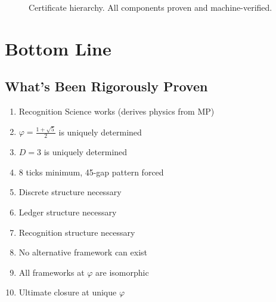 \documentclass[11pt]{article}
\theoremstyle{definition}
\theoremstyle{remark}
\begin{document}
\begin{figure}[h]
\centering
{}
\caption{Certificate hierarchy. All components proven and machine-verified.}
\end{figure}

\section{Bottom Line}

\subsection{What's Been Rigorously Proven}

\begin{enumerate}
\item Recognition Science works (derives physics from MP)
\item $\varphi = \frac{1+\sqrt{5}}{2}$ is uniquely determined
\item $D = 3$ is uniquely determined
\item 8 ticks minimum, 45-gap pattern forced
\item Discrete structure necessary
\item Ledger structure necessary
\item Recognition structure necessary
\item No alternative framework can exist
\item All frameworks at $\varphi$ are isomorphic
\item Ultimate closure at unique $\varphi$
\end{enumerate}
\end{document}
